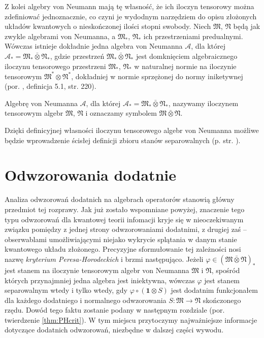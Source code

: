Z kolei algebry von Neumann mają tę własność, że ich iloczyn
tensorowy można zdefiniować jednoznacznie,
co czyni je wydodnym narzędziem do opisu złożonych układów kwantowych
o nieskończonej ilości stopni swobody.
Niech $\mathfrak{M}$, $\mathfrak{N}$ będą jak zwykle algebrami von Neumanna,
a $\mathfrak{M}_{*}$, $\mathfrak{N}_{*}$ ich przestrzeniami predualnymi.
Wówczas istnieje dokładnie jedna algebra von Neumanna $\mathcal{A}$,
dla której
$\mathcal{A}_{*} = \mathfrak{M}_{*} \bar{\otimes} \mathfrak{N}_{*}$,
gdzie przestrzeń
$\mathfrak{M}_{*} \bar{\otimes} \mathfrak{N}_{*}$ jest domknięciem
algebraicznego iloczynu tensorowego przestrzeni
$\mathfrak{M}_{*}$, $\mathfrak{N}_{*}$ w naturalnej normie na iloczynie
tensorowym $\mathfrak{M}^{*} \otimes \mathfrak{N}^{*}$,
dokładniej w normie sprzężonej do normy iniketywnej
(por. \cite{Takesaki1}, definicja 5.1, str. 220).

\begin{Definition}
 \label{def:TensorProductOfvN}
    Algebrę von Neumanna $\mathcal{A}$, dla której
    $\mathcal{A}_{*} = \mathfrak{M}_{*} \bar{\otimes} \mathfrak{N}_{*}$,
    nazywamy iloczynem tensorowym algebr $\mathfrak{M}$, $\mathfrak{N}$
    i oznaczamy symbolem
    $\mathfrak{M} \bar{\otimes} \mathfrak{N}$.
\end{Definition}

Dzięki definicyjnej własności iloczynu tensorowego algebr von Neumanna
możliwe będzie wprowadzenie ścisłej definicji zbioru stanów separowalnych
(p. str. \pageref{def:SeparableStates}).

\section{Odwzorowania dodatnie}
Analiza odwzorowań dodatnich na algebrach operatorów stanowią główny przedmiot
tej rozprawy.
Jak już zostało wspomniane powyżej, znaczenie tego typu odwzorowań dla kwantowej
teorii infomacji kryje się w nieoczekiwanym związku pomiędzy z jednej strony
odwzorowaniami dodatnimi,
z drugiej zaś -- obserwablami umożliwiającymi niejako wykrycie splątania w
danym stanie kwantowego układu złożonego.
Precyzyjne sformułowanie tej zależności nosi nazwę \emph{kryterium Peresa-Horodeckich}
i brzmi następująco.
Jeżeli $\varphi \in (\mathfrak{M} \bar{\otimes} \mathfrak{N})_{*}$ jest stanem
na iloczynie tensorowym algebr von Neumanna
$\mathfrak{M}$ i $\mathfrak{N}$,
spośród których przynajmniej jedna algebra jest iniektywna,
wówczas $\varphi$ jest stanem separowalnym wtedy i tylko wtedy,
gdy $\varphi \circ (\mathbf{1} \otimes S)$ jest dodatnim funkcjonałem
dla każdego dodatniego i normalnego odwzorowania
$S: \mathfrak{M} \rightarrow \mathfrak{N}$
skończonego rzędu.
Dowód tego faktu zostanie podany w następnym rozdziale
(por. twierdzenie \ref{thm:PHcrit}).
W tym miejscu przytoczymy najważniejsze informacje dotyczące dodatnich
odwzorowań, niezbędne w dalszej części wywodu.


